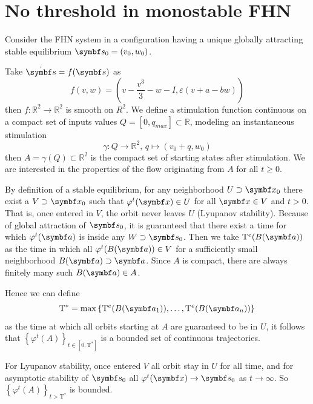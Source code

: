\chapter{No threshold in monostable FHN}
\label{app:quasi-threshold}
Consider the FHN system in a configuration having a unique globally attracting stable equilibrium $\vb{s}_0 = \left(v_0, w_0\right)$.

Take $\dot{\vb{s}} = f(\vb{s})$ as
\begin{equation}
    f(v,w) = \left( v - \frac{v^3}{3} - w -I, \varepsilon(v + a - bw) \right)
\end{equation}
then $f:\mathbb{R}^2 \to \mathbb{R}^2$ is smooth on $R^2$. 
We define a stimulation function continuous on a compact set of inputs values $Q = \left[0, q_{max}\right] \subset \mathbb{R}$, modeling an instantaneous stimulation
\begin{equation}
    \gamma:Q \to \mathbb{R}^2 \text{, } q \mapsto \left(v_0 + q , w_0\right)
\end{equation}
then $A = \gamma(Q) \subset \mathbb{R}^2$ is the compact set of starting states after stimulation. 
We are interested in the properties of the flow originating from $A$ for all $t \geq 0$. 

By definition of a stable equilibrium, for any neighborhood $U \supset \vb{x}_0$ there exist a $V \supset \vb{x}_0$ such that $\varphi^t(\vb{x}) \in U$ for all $\vb{x} \in V$ and $t > 0$. 
That is, once entered in $V$, the orbit never leaves $U$ (Lyupanov stability). 
Because of global attraction of $\vb{s}_0$, it is guaranteed that there exist a time for which $\varphi^t(\vb{a})$ is inside any $W \supset \vb{s}_0$. 
Then we take $\mathrm{T}^e(B(\vb{a}))$ as the time in which all $\varphi^t(B(\vb{a})) \in V$ for a sufficiently small neighborhood $B(\vb{a}) \supset \vb{a}$. %
Since $A$ is compact, there are always finitely many such $B(\vb{a}) \in A$. 

Hence we can define
\begin{equation}
    \mathrm{T}^* = \max \left\{\mathrm{T}^e(B(\vb{a}_1)), \dots , \mathrm{T}^e(B(\vb{a}_n))\right\}
\end{equation}
as the time at which all orbits starting at $A$ are guaranteed to be in $U$, it follows that $\left\{\varphi^t(A)\right\}_{t \in [0, \mathrm{T}^*]}$ is a bounded set of continuous trajectories. 

For Lyupanov stability, once entered $V$ all orbit stay in $U$ for all time, and for asymptotic stability of $\vb{s}_0$ all $\varphi^t(\vb{x}) \to \vb{s}_0$ as $t \to \infty$. 
So $\left\{\varphi^t(A)\right\}_{t>\mathrm{T}^*}$ is bounded. 

